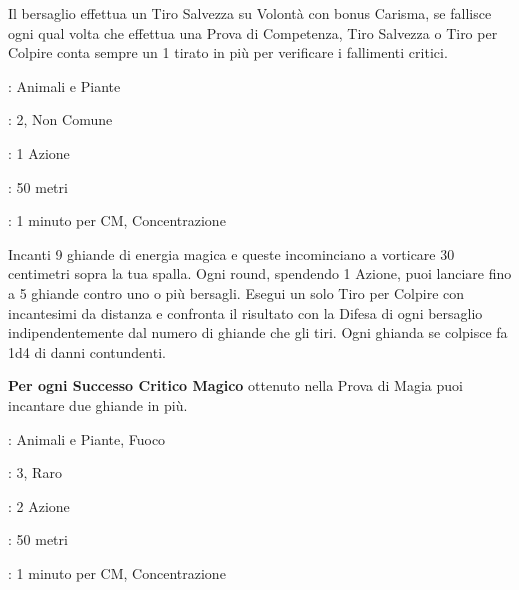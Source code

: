 \begin{multicols}{2}
Il bersaglio effettua un Tiro Salvezza su Volontà con bonus Carisma, se fallisce ogni qual volta che effettua una Prova di Competenza, Tiro Salvezza o Tiro per Colpire conta sempre un 1 tirato in più per verificare i fallimenti critici.

\noindent\colorbox{OBSSgold!10}{
\begin{minipage}{0.95\linewidth}
\begin{description}[noitemsep, topsep=0pt, parsep=0pt, partopsep=0pt, leftmargin=0cm, labelwidth=1.3cm]
	\item[\textbf{Lista}]: Animali e Piante
	\item[\textbf{Livello}]: 2, Non Comune
	\item[\textbf{Lancio}]: 1 Azione
	\item[\textbf{Gittata}]: 50 metri
	\item[\textbf{Durata}]: 1 minuto per CM, Concentrazione
\end{description}
\end{minipage}}\smallskip

Incanti 9 ghiande di energia magica e queste incominciano a vorticare 30 centimetri sopra la tua spalla.
Ogni round, spendendo 1 Azione, puoi lanciare fino a 5 ghiande contro uno o più bersagli.
Esegui un solo Tiro per Colpire con incantesimi da distanza e confronta il risultato con la Difesa di ogni bersaglio indipendentemente dal numero di ghiande che gli tiri. Ogni ghianda se colpisce fa 1d4 di danni contundenti.

\textbf{Per ogni Successo Critico Magico} ottenuto nella Prova di Magia puoi incantare due ghiande in più.

\noindent\colorbox{OBSSgold!10}{
\begin{minipage}{0.95\linewidth}
\begin{description}[noitemsep, topsep=0pt, parsep=0pt, partopsep=0pt, leftmargin=0cm, labelwidth=1.3cm]
	\item[\textbf{Lista}]: Animali e Piante, Fuoco
	\item[\textbf{Livello}]: 3, Raro
	\item[\textbf{Lancio}]: 2 Azione
	\item[\textbf{Gittata}]: 50 metri
	\item[\textbf{Durata}]: 1 minuto per CM, Concentrazione
\end{description}
\end{minipage}}\smallskip


\end{multicols}

